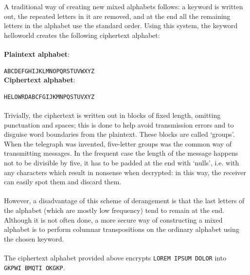 \documentclass[Lau,binding=0.6cm,oneside]{sapthesis}
\begin{document}
A traditional way of creating new mixed alphabets follows: a keyword is written out, the repeated letters in it are removed, and at the end all the remaining letters in the alphabet use the standard order. Using this system, the keyword \textsf{helloworld} creates the following ciphertext alphabet:\\\\
	\textbf{\small{Plaintext alphabet}}: \par\colorbox{gray!12}{\small{\texttt{ABCDEFGHIJKLMNOPQRSTUVWXYZ}}}\\
	\textbf{\small{Ciphertext alphabet}}:	\par\colorbox{gray!12}{\small{\texttt{HELOWRDABCFGIJKMNPQSTUVXYZ}}}\\
\ \\
Trivially, the ciphertext is written out in blocks of fixed length, omitting punctuation and spaces; this is done to help avoid transmission errors and to disguise word boundaries from the plaintext. These blocks are called `groups'. When the telegraph was invented, five-letter groups was the common way of transmitting messages. In the frequent case the length of the message happens not to be divisible by five, it has to be padded at the end with `nulls', i.e. with any characters which result in nonsense when decrypted: in this way, the receiver can easily spot them and discard them. \\\\
However, a disadvantage of this scheme of derangement is that the last letters of the alphabet (which are mostly low frequency) tend to remain at the end. Although it is not often done, a more secure way of constructing a mixed alphabet is to perform columnar transpositions on the ordinary alphabet using the chosen keyword.\\\\
The ciphertext alphabet provided above encrypts \colorbox{gray!12}{\small{\texttt{LOREM IPSUM DOLOR}}}
into\\ \colorbox{gray!12}{\small{\texttt{GKPWI BMQTI OKGKP}}}.
\end{document}
